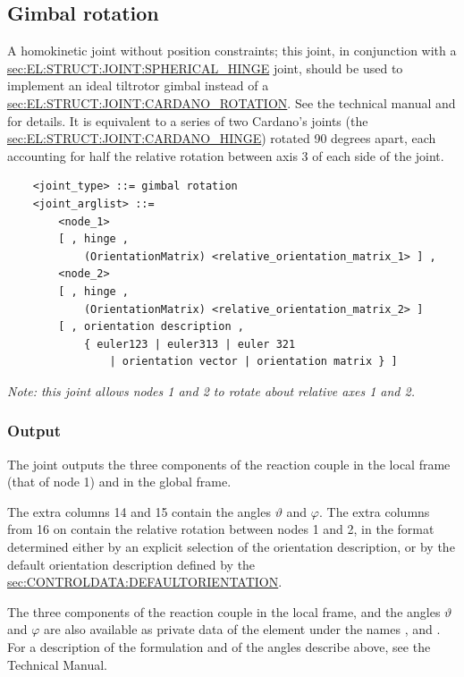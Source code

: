 \subsection{Gimbal rotation}\label{sec:EL:JOINT:GIMBALROTATION}
A homokinetic joint without position constraints;
this joint, in conjunction with a
\hyperref{\kw{spherical hinge}}{\kw{spherical hinge} (see Section~}{)}{sec:EL:STRUCT:JOINT:SPHERICAL_HINGE}
joint, should be used to implement an ideal tiltrotor gimbal
instead of a
\hyperref{\kw{cardano rotation}}{\kw{cardano rotation} (see Section~}{)}{sec:EL:STRUCT:JOINT:CARDANO_ROTATION}.
See the technical manual and \cite{GIMBAL-2008} for details.
It is equivalent to a series of two Cardano's joints
(the \hyperref{\kw{cardano hinge}}{\kw{cardano hinge}, see Section~}{}{sec:EL:STRUCT:JOINT:CARDANO_HINGE})
rotated 90 degrees apart, each accounting for half the relative rotation
between axis 3 of each side of the joint.
\begin{verbatim}
    <joint_type> ::= gimbal rotation
    <joint_arglist> ::= 
        <node_1>
        [ , hinge , 
            (OrientationMatrix) <relative_orientation_matrix_1> ] ,
        <node_2>
        [ , hinge , 
            (OrientationMatrix) <relative_orientation_matrix_2> ]
        [ , orientation description ,
            { euler123 | euler313 | euler 321
                | orientation vector | orientation matrix } ]
\end{verbatim}
{\em
    Note: this joint allows nodes 1 and 2 to rotate about relative 
    axes 1 and 2.
}

\subsubsection{Output}
The  joint outputs the three components
of the reaction couple in the local frame (that of node 1) 
and in the global frame.

The extra columns 14 and 15 contain the angles $\vartheta$ and $\varphi$.
The extra columns from 16 on contain the relative rotation
between nodes 1 and 2, in the format determined either by an explicit
selection of the orientation description, or by the default
orientation description defined by the 
\hyperref{\kw{default orientation} keyword}{\kw{default orientation} keyword (see Section~}{)}{sec:CONTROLDATA:DEFAULTORIENTATION}.

The three components of the reaction couple in the local frame, 
and the angles $\vartheta$ and $\varphi$ are also available
as private data of the element under the names ,
 and .
For a description of the formulation and of the angles describe above,
see the Technical Manual.

